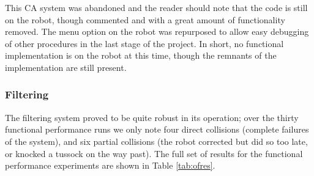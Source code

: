 \documentclass[a4paper,11pt,twoside,openright]{article}
\begin{document}
This CA system was abandoned and the reader should note that the code is still on the robot, though commented and with
a great amount of functionality removed. The menu option on the robot was repurposed to allow easy debugging of other procedures
in the last stage of the project. In short, no functional implementation is on the robot at this time, though the remnants of
the implementation are still present.

\subsubsection{Filtering}
The filtering system proved to be quite robust in its operation; over the thirty functional performance runs we only note four direct
collisions (complete failures of the system), and six partial collisions (the robot corrected but did so too late, or knocked a
tussock on the way past). The full set of results for the functional performance experiments are shown in Table \ref{tab:ofres}.
\end{document}
